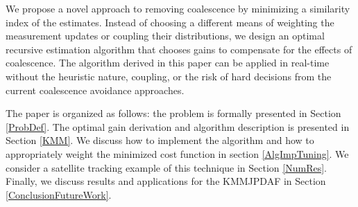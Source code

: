 \documentclass[letterpaper, 10pt, conference]{ieeeconf}
\begin{document}
We propose a novel approach to removing coalescence by minimizing a similarity index of the estimates.
Instead of choosing a different means of weighting the measurement updates or coupling their distributions, we design an optimal recursive estimation algorithm that chooses gains to compensate for the effects of coalescence.
The algorithm derived in this paper can be applied in real-time without the heuristic nature, coupling, or the risk of hard decisions from the current coalescence avoidance approaches.

The paper is organized as follows: the problem is formally presented in Section \ref{ProbDef}.
The optimal gain derivation and algorithm description is presented in Section \ref{KMM}.
We discuss how to implement the algorithm and how to appropriately weight the minimized cost function in section \ref{AlgImpTuning}.
We consider a satellite tracking example of this technique in Section \ref{NumRes}.
Finally, we discuss results and applications for the KMMJPDAF in Section \ref{ConclusionFutureWork}.
\end{document}
